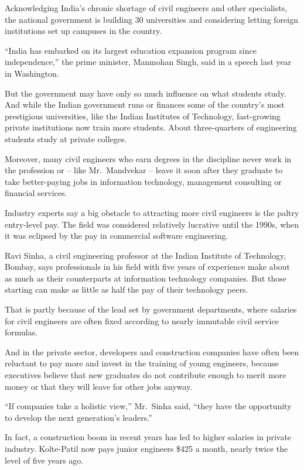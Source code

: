﻿\documentclass[12pt]{article}
\begin{document}
Acknowledging India's chronic shortage of civil engineers and other specialists, the national
government is building 30 universities and considering letting foreign institutions set up campuses
in the country.

``India has embarked on its largest education expansion program since independence,'' the prime
minister, Manmohan Singh, said in a speech last year in Washington.

But the government may have only so much influence on what students study. And while the Indian
government runs or finances some of the country's most prestigious universities, like the Indian
Institutes of Technology, fast-growing private institutions now train more students. About
three-quarters of engineering students study at private colleges.

Moreover, many civil engineers who earn degrees in the discipline never work in the profession or --
like Mr.~Mandvekar -- leave it soon after they graduate to take better-paying jobs in information
technology, management consulting or financial services.

Industry experts say a big obstacle to attracting more civil engineers is the paltry entry-level
pay. The field was considered relatively lucrative until the 1990s, when it was eclipsed by the pay
in commercial software engineering.

Ravi Sinha, a civil engineering professor at the Indian Institute of Technology, Bombay, says
professionals in his field with five years of experience make about as much as their counterparts at
information technology companies. But those starting can make as little as half the pay of their
technology peers.

That is partly because of the lead set by government departments, where salaries for civil engineers
are often fixed according to nearly immutable civil service formulas.

And in the private sector, developers and construction companies have often been reluctant to pay
more and invest in the training of young engineers, because executives believe that new graduates do
not contribute enough to merit more money or that they will leave for other jobs anyway.

``If companies take a holistic view,'' Mr.~Sinha said, ``they have the opportunity to develop the
next generation's leaders.''

In fact, a construction boom in recent years has led to higher salaries in private industry.
Kolte-Patil now pays junior engineers \$425 a month, nearly twice the level of five years ago.
\end{document}
